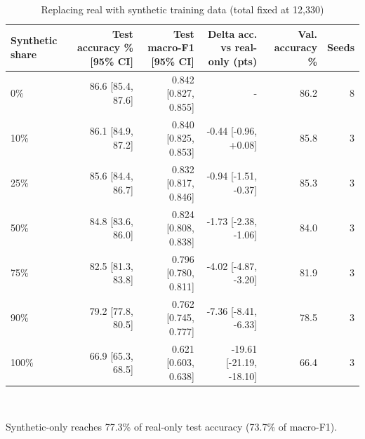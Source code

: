 \begin{table}[t]
\centering
\footnotesize
\caption{Replacing real with synthetic training data (total fixed at 12,330)}
\label{tab:t06_replacement_curve}
\begin{tabular}{lrrrrr}
\toprule
Synthetic share & Test accuracy \% [95\% CI] & Test macro-F1 [95\% CI] & Delta acc. vs real-only (pts) & Val. accuracy \% & Seeds \\
\midrule
0\% & 86.6 [85.4, 87.6] & 0.842 [0.827, 0.855] & - & 86.2 & 8 \\
10\% & 86.1 [84.9, 87.2] & 0.840 [0.825, 0.853] & -0.44 [-0.96, +0.08] & 85.8 & 3 \\
25\% & 85.6 [84.4, 86.7] & 0.832 [0.817, 0.846] & -0.94 [-1.51, -0.37] & 85.3 & 3 \\
50\% & 84.8 [83.6, 86.0] & 0.824 [0.808, 0.838] & -1.73 [-2.38, -1.06] & 84.0 & 3 \\
75\% & 82.5 [81.3, 83.8] & 0.796 [0.780, 0.811] & -4.02 [-4.87, -3.20] & 81.9 & 3 \\
90\% & 79.2 [77.8, 80.5] & 0.762 [0.745, 0.777] & -7.36 [-8.41, -6.33] & 78.5 & 3 \\
100\% & 66.9 [65.3, 68.5] & 0.621 [0.603, 0.638] & -19.61 [-21.19, -18.10] & 66.4 & 3 \\
\bottomrule
\end{tabular}
\\[2pt]\parbox{\linewidth}{\scriptsize Synthetic-only reaches 77.3\% of real-only test accuracy (73.7\% of macro-F1).}
\end{table}
